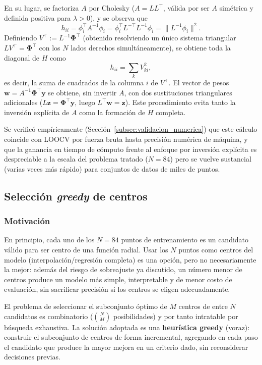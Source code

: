 \documentclass[11pt,a4paper]{article}
\newcommand{\Phimat}{\boldsymbol{\Phi}}
\newcommand{\wvec}{\mathbf{w}}
\newcommand{\yvec}{\mathbf{y}}
\begin{document}
En su lugar, se factoriza $A$ por Cholesky ($A = LL^{\!\top}$, v\'alida por
ser $A$ sim\'etrica y definida positiva para $\lambda>0$), y se observa que
\[
h_{ii} = \phi_i^{\!\top} A^{-1}\phi_i = \phi_i^{\!\top} L^{-\top}L^{-1}\phi_i
= \big\lVert L^{-1}\phi_i \big\rVert^2 .
\]
Definiendo $V^{\!\top} := L^{-1}\Phimat^{\!\top}$ (obtenido resolviendo un
\'unico sistema triangular $LV^{\!\top}=\Phimat^{\!\top}$ con los $N$ lados
derechos simult\'aneamente), se obtiene toda la diagonal de $H$ como
\[
h_{ii} = \sum_{k} V_{ki}^2,
\]
es decir, la suma de cuadrados de la columna $i$ de $V^{\!\top}$. El vector de
pesos $\wvec = A^{-1}\Phimat^{\!\top}\yvec$ se obtiene, sin invertir $A$, con
dos sustituciones triangulares adicionales ($L\mathbf{z}=\Phimat^{\!\top}
\yvec$, luego $L^{\!\top}\wvec = \mathbf{z}$). Este procedimiento evita tanto
la inversi\'on expl\'icita de $A$ como la formaci\'on de $H$ completa.

Se verific\'o emp\'iricamente (Secci\'on~\ref{subsec:validacion_numerica}) que
este c\'alculo coincide con LOOCV por fuerza bruta hasta precisi\'on num\'erica
de m\'aquina, y que la ganancia en tiempo de c\'omputo frente al enfoque por
inversi\'on expl\'icita es despreciable a la escala del problema tratado
($N=84$) pero se vuelve sustancial (varias veces m\'as r\'apido) para
conjuntos de datos de miles de puntos.

\subsection{Selecci\'on \emph{greedy} de centros}
\label{subsec:greedy}

\subsubsection{Motivaci\'on}

En principio, cada uno de los $N=84$ puntos de entrenamiento es un candidato
v\'alido para ser centro de una funci\'on radial. Usar los $N$ puntos como
centros del modelo (interpolaci\'on/regresi\'on completa) es una opci\'on,
pero no necesariamente la mejor: adem\'as del riesgo de sobreajuste ya
discutido, un n\'umero menor de centros produce un modelo m\'as simple,
interpretable y de menor costo de evaluaci\'on, sin sacrificar precisi\'on si
los centros se eligen adecuadamente.

El problema de seleccionar el subconjunto \'optimo de $M$ centros de entre $N$
candidatos es combinatorio ($\binom{N}{M}$ posibilidades) y por tanto
intratable por b\'usqueda exhaustiva. La soluci\'on adoptada es una
\textbf{heur\'istica greedy} (voraz): construir el subconjunto de centros de
forma incremental, agregando en cada paso el candidato que produce la mayor
mejora en un criterio dado, sin reconsiderar decisiones previas.
\end{document}

